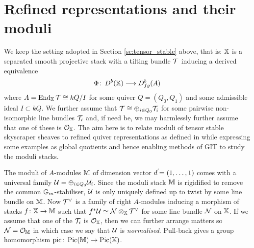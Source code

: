 \documentclass[12pt]{amsart}
\begin{document}
\section{Refined representations and their moduli}  \label{sec:refined}

We keep the setting adopted in Section \ref{sc:tensor_stable} above, that is: $\mathbb{X}$ is a separated smooth projective stack with a tilting bundle $\mathcal{T}$ inducing a derived equivalence $$\Phi \colon \, D^b(\mathbb{X}) \longrightarrow D^b_{fg}(A)$$ where $A=\operatorname{End}_{\mathbb{X}} \mathcal{T} \cong kQ/I$ for some quiver $Q = (Q_0,Q_1)$ and some admissible ideal $I\subset kQ$. We further assume that $\mathcal{T} \cong \oplus_{i\in Q_0} \mathcal{T}_i$ for some pairwise non-isomorphic line bundles $\mathcal{T}_i$ and, if need be, we may harmlessly further assume that one of these is $\mathcal{O}_{\mathbb{X}}$. The aim here is to relate moduli of tensor stable skyscraper sheaves to refined quiver representations as defined in \cite{AU} while expressing some examples as global quotients and hence enabling methods of GIT to study the moduli stacks. 

The moduli of $A$-modules $\mathbb{M}$ of dimension vector ${\vec{d}} = (1, \ldots, 1)$ comes with a universal family $\mathcal{U}  = \oplus_{i \in Q_0} \mathcal{U}_i$. Since the moduli stack $\mathbb{M}$ is rigidified to remove the common $\mathbb{G}_m$-stabiliser, $\mathcal{U}$ is only uniquely defined up to twist by some line bundle on $\mathbb{M}$. 
Now $\mathcal{T}^{\vee}$ is a family of right $A$-modules inducing a morphism of stacks $f \colon \mathbb{X} \rightarrow \mathbb{M}$ such that $f^* \mathcal{U} \simeq \mathcal{N} \otimes_{\mathbb{X}} \mathcal{T}^{\vee}$ for some line bundle $\mathcal{N}$ on $\mathbb{X}$. If we assume that one of the $\mathcal{T}_i$ is $\mathcal{O}_{\mathbb{X}}$, then we can further arrange matters so $\mathcal{N} = \mathcal{O}_{\mathbb{M}}$ in which case we say that $\mathcal{U}$ is {\em normalised}. Pull-back gives a group homomorphism $\text{pic} \colon \operatorname{Pic}(\mathbb{M}) \rightarrow \operatorname{Pic}(\mathbb{X})$. 

\end{document}
